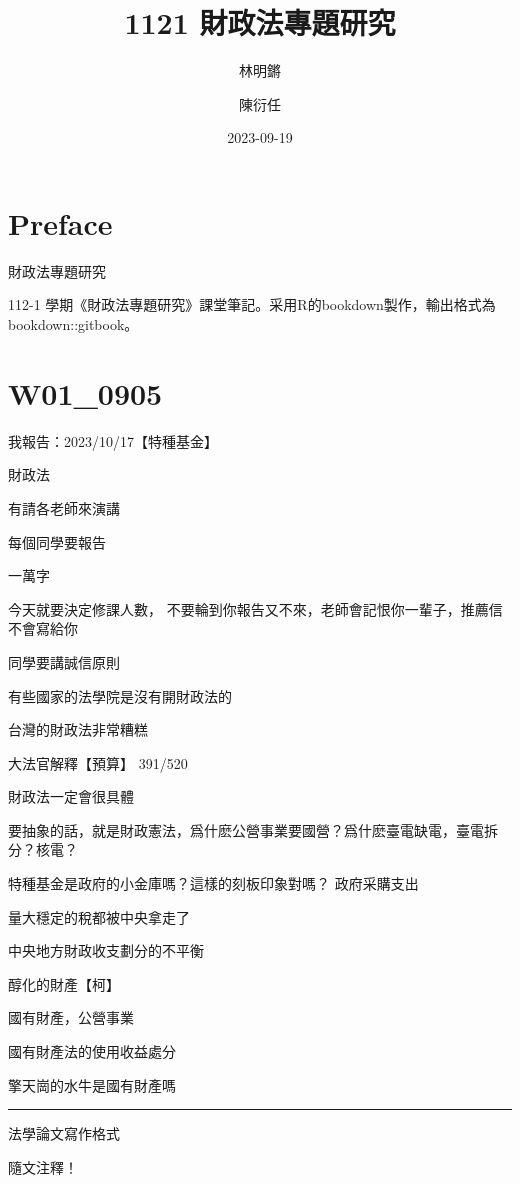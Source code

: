 \documentclass[
]{book}
\title{1121 財政法專題研究}
\author{林明鏘 \and 陳衍任}
\date{2023-09-19}
\begin{document}
\maketitle

{
\setcounter{tocdepth}{1}
\tableofcontents
}
\hypertarget{preface}{%
\chapter*{Preface}\label{preface}}

財政法專題研究

112-1 學期《財政法專題研究》課堂筆記。采用R的bookdown製作，輸出格式為bookdown::gitbook。

\hypertarget{ux7b2cux4e00ux5468}{%
\chapter{W01\_0905}\label{ux7b2cux4e00ux5468}}

我報告：2023/10/17【特種基金】

財政法

有請各老師來演講

每個同學要報告

一萬字

今天就要決定修課人數，
不要輪到你報告又不來，老師會記恨你一輩子，推薦信不會寫給你

同學要講誠信原則

有些國家的法學院是沒有開財政法的

台灣的財政法非常糟糕

大法官解釋【預算】
391/520

財政法一定會很具體

要抽象的話，就是財政憲法，爲什麽公營事業要國營？爲什麽臺電缺電，臺電拆分？核電？

特種基金是政府的小金庫嗎？這樣的刻板印象對嗎？
政府采購支出

量大穩定的稅都被中央拿走了

中央地方財政收支劃分的不平衡

醇化的財產【柯】

國有財產，公營事業

國有財產法的使用收益處分

擎天崗的水牛是國有財產嗎

\begin{center}\rule{0.5\linewidth}{0.5pt}\end{center}

法學論文寫作格式

隨文注釋！
\end{document}
